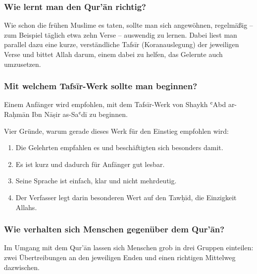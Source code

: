 \subsubsection*{Wie lernt man den Qur’ān richtig?}

Wie schon die frühen Muslime es taten, sollte man sich angewöhnen, regelmäßig – zum Beispiel
täglich etwa zehn Verse – auswendig zu lernen. Dabei liest man parallel dazu eine kurze,
verständliche Tafsīr (Koranauslegung) der jeweiligen Verse und bittet Allah  darum, einem
dabei zu helfen, das Gelernte auch umzusetzen.

\subsubsection*{Mit welchem Tafsīr-Werk sollte man beginnen?}

Einem Anfänger wird empfohlen, mit dem Tafsīr-Werk von Shaykh ʿAbd ar-Raḥmān Ibn Nāṣir
as-Saʿdī  zu beginnen.

\begin{merke}
Vier Gründe, warum gerade dieses Werk für den Einstieg empfohlen wird:
\begin{enumerate}[leftmargin=1.4em]
  \item Die Gelehrten empfahlen es und beschäftigten sich besonders damit.
  \item Es ist kurz und dadurch für Anfänger gut lesbar.
  \item Seine Sprache ist einfach, klar und nicht mehrdeutig.
  \item Der Verfasser  legt darin besonderen Wert auf den Tawḥīd, die Einzigkeit
        Allahs.
\end{enumerate}
\end{merke}

\subsubsection*{Wie verhalten sich Menschen gegenüber dem Qur’ān?}

Im Umgang mit dem Qur’ān lassen sich Menschen grob in drei Gruppen einteilen: zwei
Übertreibungen an den jeweiligen Enden und einen richtigen Mittelweg dazwischen.

